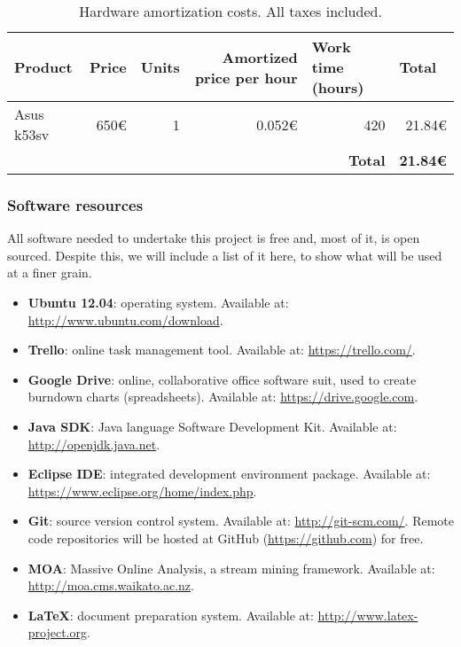\begin{table}[h]
	\centering
	\begin{tabular}{l r r r r r}
		\hline
		\textbf{Product} & \multicolumn{1}{l}{\textbf{Price}} & \multicolumn{1}{l}{\textbf{Units}} & \multicolumn{1}{p{3cm}}{\textbf{Amortized price per hour}} & \multicolumn{1}{l}{\textbf{Work time (hours)}} & \multicolumn{1}{l}{\textbf{Total}} \\ \hline
		Asus k53sv & 650€ & 1 & 0.052€ & 420 & 21.84€ \\ \hline
		&  &  &  & \textbf{Total} & \textbf{21.84€}
	\end{tabular}
	\caption[Initial estimation: hardware resources costs.]{Hardware amortization costs. All taxes included.}
	\label{table:hardware-resources}
\end{table}

\subsubsection{Software resources}

All software needed to undertake this project is free and, most of it, is open sourced. Despite this, we will include a list of it here, to show what will be used at a finer grain.

\begin{itemize}
	\item \textbf{Ubuntu 12.04}: operating system. Available at: \url{http://www.ubuntu.com/download}.
	\item \textbf{Trello}: online task management tool. Available at: \url{https://trello.com/}.
	\item \textbf{Google Drive}: online, collaborative office software suit, used to create burndown charts (spreadsheets). Available at: \url{https://drive.google.com}.
	\item \textbf{Java SDK}: Java language Software Development Kit. Available at: \url{http://openjdk.java.net}.
	\item \textbf{Eclipse IDE}: integrated development environment package. Available at: \url{https://www.eclipse.org/home/index.php}.
	\item \textbf{Git}: source version control system. Available at: \url{http://git-scm.com/}. Remote code repositories will be hosted at GitHub (\url{https://github.com}) for free.
	\item \textbf{MOA}: Massive Online Analysis, a stream mining framework. Available at: \url{http://moa.cms.waikato.ac.nz}.
	\item \textbf{\LaTeX}: document preparation system. Available at: \url{http://www.latex-project.org}.
\end{itemize}

